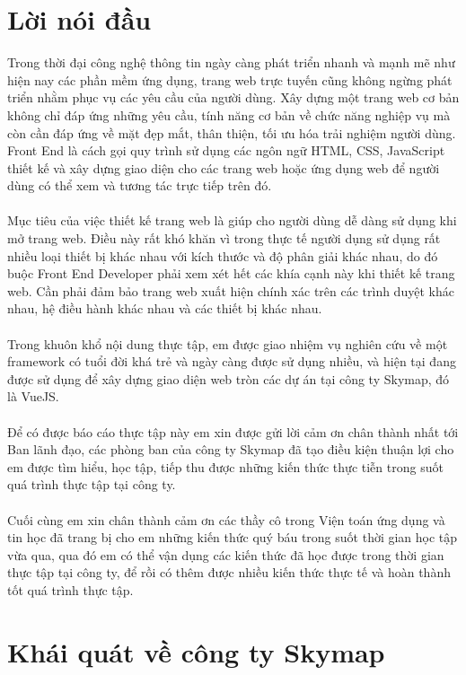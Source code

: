 \documentclass[12pt,a4paper]{report}
\begin{document}
	\chapter*{Lời nói đầu}
	Trong thời đại công nghệ thông tin ngày càng phát triển nhanh và mạnh mẽ như hiện nay
	các phần mềm ứng dụng, trang web trực tuyến cũng không ngừng phát triển nhằm phục vụ các yêu cầu của người dùng. Xây dựng một trang web cơ bản không chỉ đáp ứng những yêu cầu, tính năng cơ bản về chức năng nghiệp vụ mà còn cần đáp ứng về mặt đẹp mắt, thân thiện, tối ưu hóa trải nghiệm người dùng. Front End là cách gọi quy trình sử dụng các ngôn ngữ HTML, CSS, JavaScript thiết kế và xây dựng giao diện cho các trang web hoặc ứng dụng web để người dùng có thể xem và tương tác trực tiếp trên đó.\\\\
	Mục tiêu của việc thiết kế trang web là giúp cho người dùng dễ dàng sử dụng khi mở trang web. Điều này rất khó khăn vì trong thực tế người dụng sử dụng rất nhiều loại thiết bị khác nhau với kích thước và độ phân giải khác nhau, do đó buộc Front End Developer phải xem xét hết các khía cạnh này khi thiết kế trang web. Cần phải đảm bảo trang web xuất hiện chính xác trên các trình duyệt khác nhau, hệ điều hành khác nhau và các thiết bị khác nhau.\\\\
	Trong khuôn khổ nội dung thực tập, em được giao nhiệm vụ nghiên cứu về một framework có tuổi đời khá trẻ và ngày càng được sử dụng nhiều, và hiện tại đang được sử dụng để xây dựng giao diện web tròn các dự án tại công ty Skymap, đó là VueJS.\\\\
	Để có được báo cáo thực tập này em xin được gửi lời cảm ơn chân thành nhất tới Ban
	lãnh đạo, các phòng ban của công ty Skymap đã tạo điều kiện thuận lợi cho em được
	tìm hiểu, học tập, tiếp thu được những kiến thức thực tiễn trong suốt quá trình thực
	tập tại công ty.\\\\Cuối cùng em xin chân thành cảm ơn các thầy cô trong Viện toán ứng dụng và tin học
	đã trang bị cho em những kiến thức quý báu trong suốt thời gian học tập vừa qua, qua
	đó em có thể vận dụng các kiến thức đã học được trong thời gian thực tập tại công ty,
	để rồi có thêm được nhiều kiến thức thực tế và hoàn thành tốt quá trình thực tập.
	
	\tableofcontents
\chapter{Khái quát về công ty Skymap}
\end{document}
